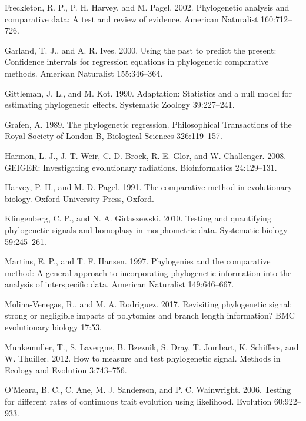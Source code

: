 \documentclass[
]{article}
\begin{document}
\leavevmode\hypertarget{ref-Freckleton_et_al2002}{}%
Freckleton, R. P., P. H. Harvey, and M. Pagel. 2002. Phylogenetic
analysis and comparative data: A test and review of evidence. American
Naturalist 160:712--726.

\leavevmode\hypertarget{ref-GarlandIves2000}{}%
Garland, T. J., and A. R. Ives. 2000. Using the past to predict the
present: Confidence intervals for regression equations in phylogenetic
comparative methods. American Naturalist 155:346--364.

\leavevmode\hypertarget{ref-Gittleman1990}{}%
Gittleman, J. L., and M. Kot. 1990. Adaptation: Statistics and a null
model for estimating phylogenetic effects. Systematic Zoology
39:227--241.

\leavevmode\hypertarget{ref-Grafen1989}{}%
Grafen, A. 1989. The phylogenetic regression. Philosophical Transactions
of the Royal Society of London B, Biological Sciences 326:119--157.

\leavevmode\hypertarget{ref-Harmon2008}{}%
Harmon, L. J., J. T. Weir, C. D. Brock, R. E. Glor, and W. Challenger.
2008. GEIGER: Investigating evolutionary radiations. Bioinformatics
24:129--131.

\leavevmode\hypertarget{ref-HarveyPagel1991}{}%
Harvey, P. H., and M. D. Pagel. 1991. The comparative method in
evolutionary biology. Oxford University Press, Oxford.

\leavevmode\hypertarget{ref-Klingenberg2010}{}%
Klingenberg, C. P., and N. A. Gidaszewski. 2010. Testing and quantifying
phylogenetic signals and homoplasy in morphometric data. Systematic
biology 59:245--261.

\leavevmode\hypertarget{ref-MartinsHansen1997}{}%
Martins, E. P., and T. F. Hansen. 1997. Phylogenies and the comparative
method: A general approach to incorporating phylogenetic information
into the analysis of interspecific data. American Naturalist
149:646--667.

\leavevmode\hypertarget{ref-MolinaVenegas2017}{}%
Molina-Venegas, R., and M. A. Rodriguez. 2017. Revisiting phylogenetic
signal; strong or negligible impacts of polytomies and branch length
information? BMC evolutionary biology 17:53.

\leavevmode\hypertarget{ref-Munkemuller_et_al2012}{}%
Munkemuller, T., S. Lavergne, B. Bzeznik, S. Dray, T. Jombart, K.
Schiffers, and W. Thuiller. 2012. How to measure and test phylogenetic
signal. Methods in Ecology and Evolution 3:743--756.

\leavevmode\hypertarget{ref-OMeara_et_al2006}{}%
O'Meara, B. C., C. Ane, M. J. Sanderson, and P. C. Wainwright. 2006.
Testing for different rates of continuous trait evolution using
likelihood. Evolution 60:922--933.
\end{document}
